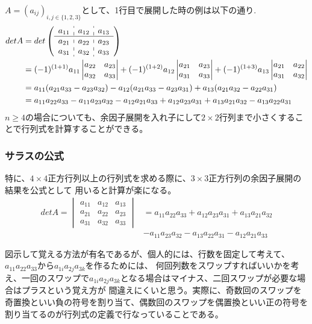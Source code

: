 \documentclass[10pt]{ujarticle}
\begin{document}
$A=(a_{ij})_{i,j\in\{1,2,3\}}$として、1行目で展開した時の例は以下の通り.
$$
\begin{aligned}
  detA&=det\left(\begin{array}{c:c:c}
    a_{11}&a_{12}&a_{13}\\ \hline
    a_{21}&a_{22}&a_{23}\\
    a_{31}&a_{32}&a_{33}
  \end{array}\right)\\
  &=(-1)^{(1+1)}a_{11}\begin{vmatrix}
    a_{22}&a_{23}\\
    a_{32}&a_{33}
  \end{vmatrix}+(-1)^{(1+2)}a_{12}\begin{vmatrix}
    a_{21}&a_{23}\\
    a_{31}&a_{33}
  \end{vmatrix}+(-1)^{(1+3)}a_{13}\begin{vmatrix}
    a_{21}&a_{22}\\
    a_{31}&a_{32}
  \end{vmatrix}\\
  &=a_{11}(a_{21}a_{33}-a_{23}a_{32})-a_{12}(a_{21}a_{33}-a_{23}a_{31})+a_{13}(a_{21}a_{32}-a_{22}a_{31})\\
  &=a_{11}a_{22}a_{33}-a_{11}a_{23}a_{32}-a_{12}a_{21}a_{33}+a_{12}a_{23}a_{31}+a_{13}a_{21}a_{32}-a_{13}a_{22}a_{31}
\end{aligned}
$$
$n\geq 4$の場合についても、余因子展開を入れ子にして$2\times 2$行列まで小さくすることで行列式を計算することができる。

\subsubsection{サラスの公式}
特に、$4\times 4$正方行列以上の行列式を求める際に、$3\times 3$正方行列の余因子展開の結果を公式として
用いると計算が楽になる。
$$
\begin{aligned}
  detA=\begin{vmatrix}
    a_{11} & a_{12} & a_{13}\\
    a_{21} & a_{22} & a_{23}\\
    a_{31} & a_{32} & a_{33}
  \end{vmatrix}&=a_{11}a_{22}a_{33}+a_{12}a_{23}a_{31}+a_{13}a_{21}a_{32}\\
  &-a_{11}a_{23}a_{32}-a_{13}a_{22}a_{31}-a_{12}a_{21}a_{33}
\end{aligned}
$$

図示して覚える方法が有名であるが、個人的には、行数を固定して考えて、$a_{11}a_{22}a_{33}$から$a_{1i}a_{2j}a_{3k}$を作るためには、
何回列数をスワップすればいいかを考え、一回のスワップで$a_{1i}a_{2j}a_{3k}$となる場合はマイナス、二回スワップが必要な場合はプラスという覚え方が
間違えにくいと思う。実際に、奇数回のスワップを奇置換といい負の符号を割り当て、偶数回のスワップを偶置換といい正の符号を割り当てるのが行列式の定義で行なっていることである。
\end{document}
